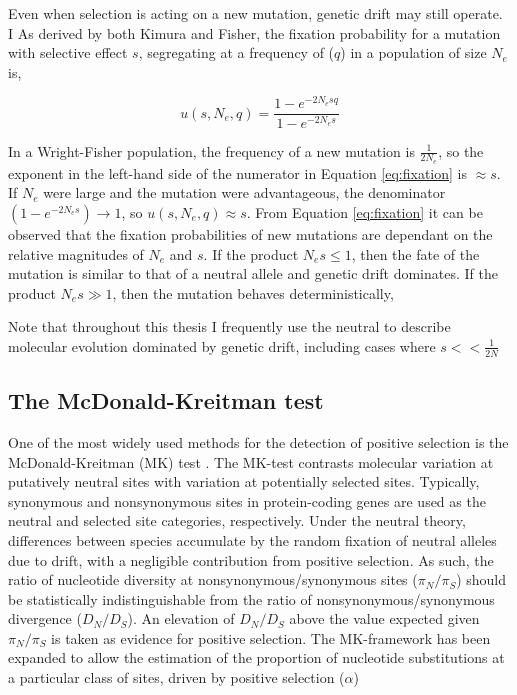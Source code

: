 	Even when selection is acting on a new mutation, genetic drift may still operate. I As derived by both Kimura and Fisher, the fixation probability for a mutation with selective effect $s$, segregating at a frequency of ($q$) in a population of size $N_e$ is,

\begin{equation}
	u(s, N_e, q) = \frac{1 - e^{-2N_esq}}{1 - e^{-2N_es}}
	\label{eq:fixation}
\end{equation}

\noindent
In a Wright-Fisher population, the frequency of a new mutation is $\frac{1}{2N_e}$, so the exponent in the left-hand side of the numerator in Equation \ref{eq:fixation} is $\approx s$. If $N_e$ were large and the mutation were advantageous, the denominator $(1 - e^{-2N_es}) \to 1$, so $u(s, N_e, q) \approx s$. From Equation \ref{eq:fixation} it can be observed that the fixation probabilities of new mutations are dependant on the relative magnitudes of $N_e$ and $s$. If the product $N_es \leq 1$, then the fate of the mutation is similar to that of a neutral allele and genetic drift dominates. If the product $N_es \gg 1$, then the mutation behaves deterministically, 

	Note that throughout this thesis I frequently use the neutral to describe molecular evolution dominated by genetic drift, including cases where $s << \frac{1}{2N}$

\subsection{The McDonald-Kreitman test}

	One of the most widely used methods for the detection of positive selection is the McDonald-Kreitman (MK) test \citep{RN293}. The MK-test contrasts molecular variation at putatively neutral sites with variation at potentially selected sites. Typically, synonymous and nonsynonymous sites in protein-coding genes are used as the neutral and selected site categories, respectively. Under the neutral theory, differences between species accumulate by the random fixation of neutral  alleles due to drift, with a negligible contribution from positive selection. As such, the ratio of nucleotide diversity at nonsynonymous/synonymous sites ($\pi_N / \pi_S$) should be statistically indistinguishable from the ratio of nonsynonymous/synonymous divergence ($D_N / D_S$). An elevation of $D_N / D_S$ above the value expected given $\pi_N / \pi_S$ is taken as evidence for positive selection. The MK-framework has been expanded to allow the estimation of the proportion of nucleotide substitutions at a particular class of sites, driven by positive selection ($\alpha$)

